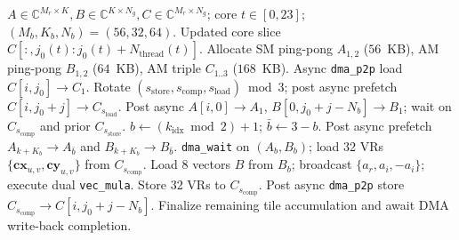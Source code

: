 \documentclass[conference]{IEEEtran}
\begin{document}
\begin{algorithm}[t]
\caption{Device-Side 14-Channel Tri-Buffered DSP Kernel}
\label{alg:device_kernel}
\footnotesize
\begin{algorithmic}[1]
\REQUIRE $A \in \mathbb{C}^{M_r \times K}, B \in \mathbb{C}^{K \times N_g}, C \in \mathbb{C}^{M_r \times N_g}$; core $t \in [0, 23]$; $(M_b, K_b, N_b) = (56, 32, 64)$.
\ENSURE Updated core slice $C[:, j_0(t) : j_0(t)+N_{\mathrm{thread}}(t)]$.
\STATE Allocate SM ping-pong $A_{1,2}$ ($56$~KB), AM ping-pong $B_{1,2}$ ($64$~KB), AM triple $C_{1..3}$ ($168$~KB).
    \STATE Async \texttt{dma\_p2p} load $C[i, j_0] \to C_1$.
        \STATE Rotate $(s_{\mathrm{store}}, s_{\mathrm{comp}}, s_{\mathrm{load}}) \bmod 3$; post async prefetch $C[i, j_0+j] \to C_{s_{\mathrm{load}}}$.
        \STATE Post async $A[i, 0] \to A_1$, $B[0, j_0+j-N_b] \to B_1$; wait on $C_{s_{\mathrm{comp}}}$ and prior $C_{s_{\mathrm{store}}}$.
            \STATE $b \leftarrow (k_{\mathrm{idx}} \bmod 2) + 1$; $\bar{b} \leftarrow 3 - b$.
                \STATE Post async prefetch $A_{k+K_b} \to A_{\bar{b}}$ and $B_{k+K_b} \to B_{\bar{b}}$.
            \ENDIF
            \STATE \texttt{dma\_wait} on $(A_b, B_b)$; load 32 VRs $\{\mathbf{cx}_{u,v}, \mathbf{cy}_{u,v}\}$ from $C_{s_{\mathrm{comp}}}$.
                \STATE Load 8 vectors $B$ from $B_b$; broadcast $\{a_r, a_i, -a_i\}$; execute dual \texttt{vec\_mula}.
            \ENDFOR
            \STATE Store 32 VRs to $C_{s_{\mathrm{comp}}}$.
        \ENDFOR
        \STATE Post async \texttt{dma\_p2p} store $C_{s_{\mathrm{comp}}} \to C[i, j_0+j-N_b]$.
    \ENDFOR
    \STATE Finalize remaining tile accumulation and await DMA write-back completion.
\ENDFOR
\end{algorithmic}
\end{algorithm}
\end{document}
